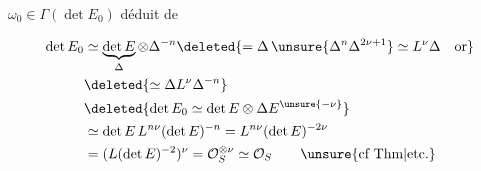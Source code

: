 $\omega_0\in\Gamma(\det E_0)$ déduit de

\[
\begin{aligned}
 \det E_0&\simeq\underbrace{\det E}_{\Delta}\otimes\Delta^{-n}
 \deleted{=\Delta\,\unsure{\Delta^n\Delta^{2\nu+1}}\simeq L^\nu\Delta\quad\text{or}}\\
 &\deleted{\simeq\Delta L^\nu\Delta^{-n}}\\
 &\deleted{\det E_0\simeq\det E\otimes\Delta E^{\unsure{-\nu}}}\\
 &\simeq\det E\,L^{n\nu}(\det E)^{-n}=L^{n\nu}(\det E)^{-2\nu}\\
 &=(L(\det E)^{-2})^\nu=\mathcal O_S^{\otimes\nu}\simeq\mathcal O_S\qquad\unsure{\text{cf Thm}|\text{etc.}}
\end{aligned}
\]

